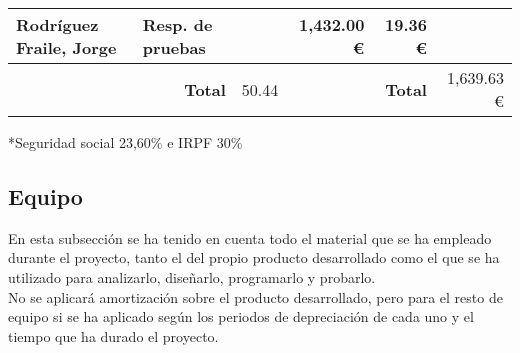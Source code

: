 \begin{table}[H]
{\begin{tabular}{ll|c|rr|r|}
			\multicolumn{1}{|l|}{Rodríguez Fraile, Jorge}                             & Resp. de pruebas                                            &                                        & \multicolumn{1}{r|}{1,432.00 €}                              & 19.36 €                                                                              &                                                                                      \\ \hline
			                                                                          & \multicolumn{1}{r|}{\textbf{Total}}                         & 50.44                                  & \multicolumn{1}{l}{}                                         & \textbf{Total}                                                                       & 1,639.63 €                                                                           \\ \cline{3-3} \cline{6-6}
		\end{tabular}%
	}
\end{table}

*Seguridad social 23,60\%\cite{noauthor_seguridad_nodate} e IRPF 30\%\cite{trecet_irpf_nodate}

\subsection{Equipo}
En esta subsección se ha tenido en cuenta todo el material que se ha empleado durante el proyecto, tanto el del propio producto desarrollado como el que se ha utilizado para analizarlo, diseñarlo, programarlo y probarlo. \\ No se aplicará amortización sobre el producto desarrollado, pero para el resto de equipo si se ha aplicado según los periodos de depreciación de cada uno \cite{thiebaud_-muller_service_2018} y el tiempo que ha durado el proyecto.

